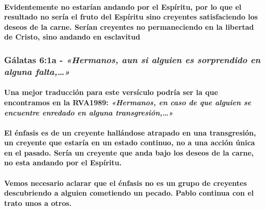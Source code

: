\documentclass[11a pt,twoside]{article}
\newcommand{\scripture}[1]{%
  {\fontsize{12pt}{16pt}\selectfont\ScriptureFont\itshape #1}%
}
\let\oldsubsubsection\subsubsection
\renewcommand{\subsubsection}{\needspace{4\baselineskip}\oldsubsubsection}
\let\oldparagraph\paragraph
\renewcommand{\paragraph}{\needspace{3\baselineskip}\oldparagraph}
\begin{document}
\paragraph{Evidentemente no estarían andando por el Espíritu, por lo que
el resultado no sería el fruto del Espíritu sino creyentes satisfaciendo
los deseos de la carne. Serían creyentes no permaneciendo en la libertad
de Cristo, sino andando en
esclavitud}\label{evidentemente-no-estaruxedan-andando-por-el-espuxedritu-por-lo-que-el-resultado-no-seruxeda-el-fruto-del-espuxedritu-sino-creyentes-satisfaciendo-los-deseos-de-la-carne.-seruxedan-creyentes-no-permaneciendo-en-la-libertad-de-cristo-sino-andando-en-esclavitud}

\subsubsection{\texorpdfstring{Gálatas 6:1a -
\scripture{«Hermanos, aun si alguien es sorprendido en alguna falta,…»}}{Gálatas 6:1a - }}\label{guxe1latas-61a---hermanos-aun-si-alguien-es-sorprendido-en-alguna-falta}

\paragraph{\texorpdfstring{Una mejor traducción para este versículo
podría ser la que encontramos en la RVA1989:
\scripture{«Hermanos, en caso de que alguien se encuentre enredado en alguna transgresión,…»}}{Una mejor traducción para este versículo podría ser la que encontramos en la RVA1989: }}\label{una-mejor-traducciuxf3n-para-este-versuxedculo-podruxeda-ser-la-que-encontramos-en-la-rva1989-hermanos-en-caso-de-que-alguien-se-encuentre-enredado-en-alguna-transgresiuxf3n}

\paragraph{El énfasis es de un creyente hallándose atrapado en una
transgresión, un creyente que estaría en un estado continuo, no a una
acción única en el pasado. Sería un creyente que anda bajo los deseos de
la carne, no esta andando por el
Espíritu.}\label{el-uxe9nfasis-es-de-un-creyente-halluxe1ndose-atrapado-en-una-transgresiuxf3n-un-creyente-que-estaruxeda-en-un-estado-continuo-no-a-una-acciuxf3n-uxfanica-en-el-pasado.-seruxeda-un-creyente-que-anda-bajo-los-deseos-de-la-carne-no-esta-andando-por-el-espuxedritu.}

\paragraph{Vemos necesario aclarar que el énfasis no es un grupo de
creyentes descubriendo a alguien cometiendo un pecado. Pablo continua
con el trato unos a
otros.}\label{vemos-necesario-aclarar-que-el-uxe9nfasis-no-es-un-grupo-de-creyentes-descubriendo-a-alguien-cometiendo-un-pecado.-pablo-continua-con-el-trato-unos-a-otros.}
\end{document}

